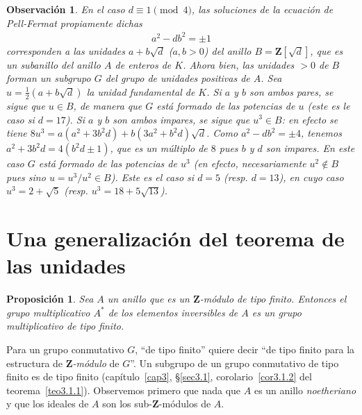 \documentclass[10pt,oneside,bibtotoc,smallheadings,leqno,a5paper,DIV=12]{scrbook}
\newcommand{\ZZ}{\mathbf{Z}}
\numberwithin{equation}{section}
\newenvironment{comm}%
	{\begin{trivlist}\item\small\itshape}
	{\end{trivlist}}
\theoremstyle{defi}
\theoremstyle{enonce}
\newtheorem{proposition}{Proposici\'on}
\theoremstyle{rem}
\newtheorem*{remark*}{Observaci\'on}
\numberwithin{theorem}{section}
\numberwithin{proposition}{section}
\numberwithin{definition}{section}
\numberwithin{lemma}{section}
\numberwithin{corollary}{section}
\numberwithin{example}{section}
\numberwithin{footnote}{section}%
\begin{document}
\begin{remark*}
En el caso $d\equiv 1\pmod 4$, las soluciones de la ecuaci\'on de Pell-Fermat propiamente dichas
\begin{gather}
a^{2}-db^{2}=\pm 1
\end{gather}
corresponden a las unidades $a+b\sqrt{d}$ ($a,b>0$) del anillo $B=\ZZ[\sqrt{d}]$, que es un subanillo
del anillo $A$ de enteros de $K$. Ahora bien, las unidades $>0$ de $B$ forman un subgrupo $G$ del grupo de
unidades positivas de $A$. Sea $u=\frac{1}{2}(a+b\sqrt{d})$ la unidad fundamental de $K$. Si $a$ y $b$ son
ambos {\em pares,} se sigue que $u\in B$, de manera que $G$ {\em est\'a formado de las potencias de $u$} (este
es le caso si $d=17$). Si $a$ y $b$ son ambos {\em impares, se sigue que $u^{3}\in B$:} en efecto se
tiene $8u^{3}=a(a^{2}+3b^{2}d)+b(3a^{2}+b^{2}d)\sqrt{d}$. Como $a^{2}-db^{2}=\pm 4$, tenemos
$a^{2}+3b^{2}d=4(b^{2}d\pm 1)$, que es un m\'ultiplo de $8$ pues $b$ y $d$ son impares. En este caso $G$
{\em est\'a formado de las potencias de $u^{3}$} (en efecto, necesariamente $u^{2}\notin B$ pues sino
$u=u^{3}/u^{2}\in B$). Este es el caso si $d=5$ (resp. $d=13$), en cuyo caso $u^{3}=2+\sqrt{5}$
(resp. $u^{3}=18+5\sqrt{13}$).
\end{remark*}

\section{Una generalizaci\'on del teorema de las unidades}

\begin{proposition}
Sea $A$ un anillo que es un $\ZZ$-m\'odulo de tipo finito. Entonces el grupo multiplicativo
$A^{*}$ de los elementos inversibles de $A$ es un grupo multiplicativo de tipo finito.
\end{proposition}

Para un grupo conmutativo $G$, ``de tipo finito'' quiere decir ``de tipo finito para la estructura
de {\em $\ZZ$-m\'odulo} de $G$''. Un subgrupo de un grupo conmutativo de tipo finito es de tipo finito
(cap\'itulo~\ref{cap3}, \S\ref{sec3.1}, corolario~\ref{cor3.1.2} del teorema~\ref{teo3.1.1}).
Observemos primero que nada que $A$ es un anillo {\em noetheriano}
y que los ideales de $A$ son los sub-$\ZZ$-m\'odulos de $A$.
\end{document}
